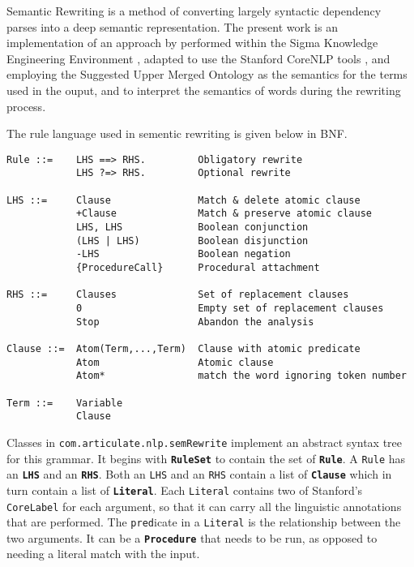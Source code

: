 \documentclass{book}
\newcommand{\tsumo}[1]{{\small \textbf{\texttt{#1}}}}
\begin{document}
Semantic Rewriting is a method of converting largely syntactic dependency parses
into a deep semantic representation.  The present work is an implementation of
an approach by \citep{crouch2005packed,crouch2006} performed within the Sigma
Knowledge Engineering Environment \citep{ac13}, adapted to use the Stanford
CoreNLP tools \citep{manning-etal:2014:ACLDemo}, and employing the Suggested
Upper Merged Ontology \citep{np01,p11} as the semantics for the terms used in
the ouput, and to interpret the semantics of words during the rewriting process.

The rule language used in sementic rewriting is given below in BNF.

\begin{verbatim}
Rule ::=    LHS ==> RHS.         Obligatory rewrite
            LHS ?=> RHS.         Optional rewrite

LHS ::=     Clause               Match & delete atomic clause
            +Clause              Match & preserve atomic clause
            LHS, LHS             Boolean conjunction
            (LHS | LHS)          Boolean disjunction
            -LHS                 Boolean negation
            {ProcedureCall}      Procedural attachment

RHS ::=     Clauses              Set of replacement clauses
            0                    Empty set of replacement clauses
            Stop                 Abandon the analysis

Clause ::=  Atom(Term,...,Term)  Clause with atomic predicate
            Atom                 Atomic clause
            Atom*                match the word ignoring token number

Term ::=    Variable
            Clause
\end{verbatim}

Classes in \texttt{com.articulate.nlp.semRewrite} implement an abstract syntax
tree for this grammar.  It begins with \tsumo{RuleSet}
to contain the set of \tsumo{Rule}.  A \texttt{Rule} has an
\tsumo{LHS} and an \tsumo{RHS}. Both an
\texttt{LHS} and an \texttt{RHS} contain a list of
\tsumo{Clause} which in turn contain a list of
\tsumo{Literal}.  Each \texttt{Literal} contains two of
Stanford's \texttt{CoreLabel} for each argument, so that it can carry all the linguistic
annotations that are performed.  The \texttt{pred}icate in a \texttt{Literal} is
the relationship between the two arguments.  It can be a 
\tsumo{Procedure} that needs to be run, as opposed to
needing a literal match with the input.
\end{document}
